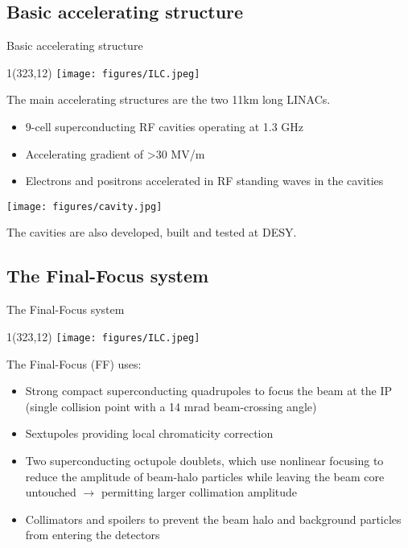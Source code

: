 \documentclass[xcolor={dvipsnames}]{beamer}
\newcommand{\ilclogo}{
  \setlength{\TPHorizModule}{1pt}
  \setlength{\TPVertModule}{1pt}
  \begin{textblock}{1}(323,12)
   \texttt{[image: figures/ILC.jpeg]}
  \end{textblock}
}
\begin{document}
\subsection{Basic accelerating structure}
\begin{frame}{Basic accelerating structure}
\ilclogo
The main accelerating structures are the two 11km long LINACs.
\begin{itemize}
\item 9-cell superconducting RF cavities operating at 1.3 GHz 
\item Accelerating gradient of >30 MV/m
\item Electrons and positrons accelerated in RF standing waves in the cavities 
\end{itemize}
\begin{center}
\texttt{[image: figures/cavity.jpg]}
\end{center}
The cavities are also developed, built and tested at DESY.
\end{frame}

\subsection{The Final-Focus system}
\begin{frame}{The Final-Focus system}
 \ilclogo
 The Final-Focus (FF) uses:
\begin{itemize}
 \item Strong compact superconducting quadrupoles to focus the
beam at the IP (single collision point with a 14 mrad beam-crossing angle)
\item Sextupoles providing local chromaticity correction
\item Two superconducting octupole doublets, which use nonlinear
focusing to reduce the amplitude of beam-halo particles while leaving the beam core untouched $\rightarrow$ permitting larger collimation amplitude
\item Collimators and spoilers to prevent the beam halo and background particles from entering the detectors
\end{itemize}
\end{frame}
\end{document}
